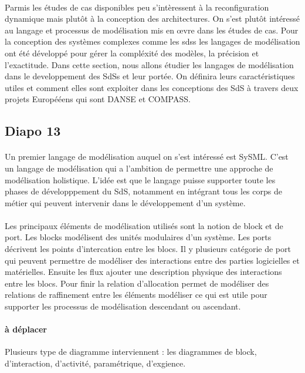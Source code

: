 \paragraph{}
Parmis les études de cas disponibles peu s'intèressent à la
reconfiguration dynamique mais plutôt à la conception des
architectures. On s'est plutôt intéressé au langage et processus de
modélisation mis en \oe{}vre dans les études de cas. 
%
Pour la conception des systèmes complexes comme les sdss les langages
de modélisation ont été développé pour gérer la compléxité des
modèles, la précision et l'exactitude. Dans cette section, nous allons
étudier les langages de modélisation dans le developpement des SdSs et
leur portée. On définira leurs caractéristiques utiles et comment
elles sont exploiter dans les conceptions des SdS à travers deux
projets Europééens qui sont DANSE et COMPASS.


\subsection{Diapo 13}
\paragraph{}
Un premier langage de modélisation auquel on s'est intéressé est
SySML. C'est un langage de modélisation qui a l'ambition de permettre
une approche de modélisation holistique. L'idée est que le langage
puisse supporter toute les phases de développpement du SdS, notamment
en intégrant tous les corps de métier qui peuvent intervenir dans le
développement d'un système. 

\paragraph{}
Les principaux éléments de modélisation utilisés sont la notion de
block et de port. 
Les blocks modélisent des unités modulaires d'un système. 
Les ports décrivent les points d'intercation entre les blocs. Il y
plusieurs catégorie de port qui peuvent permettre de modéliser des
interactions entre des parties logicielles et matérielles. 
Ensuite les flux ajouter une description physique des interactions
entre les blocs. 
Pour finir la relation d'allocation permet de modéliser des relations
de raffinement entre les éléments modéliser ce qui est utile pour
supporter les processus de modélisation descendant ou ascendant. 

\paragraph{à déplacer} Plusieurs type de diagramme interviennent : les
diagrammes de block, d'interaction, d'activité, paramétrique,
d'exgience. 

